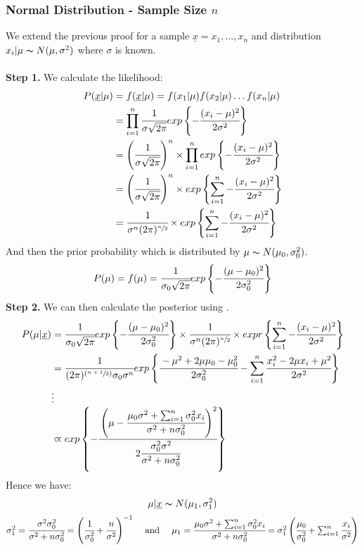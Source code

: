 \documentclass{report}
\begin{document}
\subsubsection*{Normal Distribution - Sample Size $n$}
We extend the previous proof for a sample $\underline{x} = x_1, \dots, x_n$ and distribution $x_i|\mu \thicksim N(\mu, \sigma^2)$ where $\sigma$ is known.
\\
\\ \textbf{Step 1.} We calculate the likelihood:
\[\begin{split}
		P(\underline{x}|\mu) &= f(\underline{x}|\mu) = f(x_1|\mu)f(x_2|\mu) \dots f(x_n|\mu)\\
		&= \prod_{i=1}^n \cfrac{1}{\sigma \sqrt{2 \pi}} exp\left\{ -\cfrac{(x_i - \mu)^2}{2\sigma^2}\right\} \\
		&= \left( \cfrac{1}{\sigma \sqrt{2 \pi}} \right)^n \times  \prod_{i=1}^n  exp\left\{ -\cfrac{(x_i - \mu)^2}{2\sigma^2}\right\} \\
		&= \left( \cfrac{1}{\sigma \sqrt{2 \pi}} \right)^n \times  exp\left\{ \sum_{i=1}^n -\cfrac{(x_i - \mu)^2}{2\sigma^2}\right\} \\
		&= \cfrac{1}{\sigma^n (2 \pi)^{\sfrac{n}{2}}} \times  exp\left\{ \sum_{i=1}^n -\cfrac{(x_i - \mu)^2}{2\sigma^2}\right\} \\
	\end{split}\]
And then the prior probability which is distributed by $\mu \thicksim N(\mu_0, \sigma^2_0)$.
\[P(\mu) = f(\mu) = \cfrac{1}{\sigma_0 \sqrt{2 \pi}} exp \left\{ -\cfrac{(\mu - \mu_0)^2}{2\sigma_0^2} \right\}\]
\textbf{Step 2.} We can then calculate the posterior using  .
\[\begin{split}
		P(\mu|\underline{x}) &= \cfrac{1}{\sigma_0 \sqrt{2 \pi}} exp \left\{ -\cfrac{(\mu - \mu_0)^2}{2\sigma_0^2} \right\} \times \cfrac{1}{\sigma^n (2 \pi)^{\sfrac{n}{2}}} \times  expr\left\{ \sum_{i=1}^n -\cfrac{(x_i - \mu)^2}{2\sigma^2}\right\} \\
		&= \cfrac{1}{(2 \pi)^{(\sfrac{n+1}{2})} \sigma_0 \sigma^n } exp \left\{ \cfrac{-\mu^2 + 2 \mu\mu_0 - \mu_0^2}{2\sigma^2_0} - \sum_{i=1}^n \cfrac{x_i^2 - 2\mu x_i + \mu^2}{2 \sigma^2} \right\} \\
		& \vdots \\
		& \varpropto exp \left\{ - \cfrac{\left(\mu - \cfrac{\mu_0 \sigma^2 + \sum_{i=1}^n \sigma_0^2x_i}{\sigma^2 + n \sigma^2_0}\right)^2}{2 \cfrac{\sigma_0^2\sigma^2}{\sigma^2 + n\sigma^2_0}} \right\}
	\end{split}\]
Hence we have:
\[\mu|\underline{x} \thicksim N(\mu_1, \sigma_1^2)\]
\[\begin{matrix}
		\sigma_1^2 = \cfrac{\sigma^2\sigma_0^2}{\sigma^2 + n \sigma_0^2} = \left( \cfrac{1}{\sigma_0^2} + \cfrac{n}{\sigma^2} \right)^{-1} & \text{  and  } & \mu_1 = \cfrac{\mu_0\sigma^2 + \sum_{i=1}^n\sigma^2_0x_i}{\sigma^2 + n\sigma_0^2} = \sigma_1^2\left( \cfrac{\mu_0}{\sigma_0^2} + \sum_{i=1}^n \cfrac{x_i}{\sigma^2} \right)
	\end{matrix}\]
\end{document}
